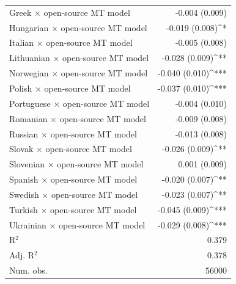 \begin{center}
\begin{longtable}{l D{)}{)}{11)3}}
\quad Greek $\times$ open-source MT model        & -0.004 \; (0.009)       \\
\quad Hungarian $\times$ open-source MT model    & -0.019 \; (0.008)^{*}   \\
\quad Italian $\times$ open-source MT model      & -0.005 \; (0.008)       \\
\quad Lithuanian $\times$ open-source MT model   & -0.028 \; (0.009)^{**}  \\
\quad Norwegian $\times$ open-source MT model    & -0.040 \; (0.010)^{***} \\
\quad Polish $\times$ open-source MT model       & -0.037 \; (0.010)^{***} \\
\quad Portuguese $\times$ open-source MT model   & -0.004 \; (0.010)       \\
\quad Romanian $\times$ open-source MT model     & -0.009 \; (0.008)       \\
\quad Russian $\times$ open-source MT model      & -0.013 \; (0.008)       \\
\quad Slovak $\times$ open-source MT model       & -0.026 \; (0.009)^{**}  \\
\quad Slovenian $\times$ open-source MT model    & 0.001 \; (0.009)        \\
\quad Spanish $\times$ open-source MT model      & -0.020 \; (0.007)^{**}  \\
\quad Swedish $\times$ open-source MT model      & -0.023 \; (0.007)^{**}  \\
\quad Turkish $\times$ open-source MT model      & -0.045 \; (0.009)^{***} \\
\quad Ukrainian $\times$ open-source MT model    & -0.029 \; (0.008)^{***} \\
\midrule
R$^2$                                            & 0.379                   \\
Adj. R$^2$                                       & 0.378                   \\
Num. obs.                                        & 56000                   \\
\end{longtable}
\end{center}
